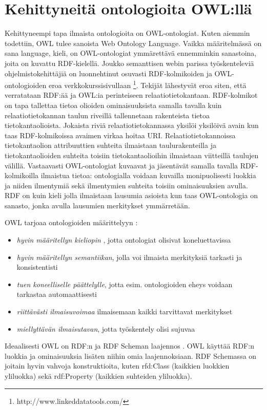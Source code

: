 \documentclass[finnish]{tktltiki2}
\theoremstyle{definition}
\theoremstyle{remark}
\begin{document}
\section{Kehittyneitä ontologioita OWL:llä}

Kehittyneempi tapa ilmaista ontologioita on OWL-ontologiat. Kuten aiemmin todettiin, OWL tulee 
sanoista Web Ontology Language. Vaikka määritelmässä on sana language, kieli, on 
OWL-ontologiat ymmärettävä ennemminkin sanastoina, joita on kuvattu RDF-kielellä.
Joukko semanttisen webin parissa työskenteleviä ohjelmistokehittäjiä on luonnehtinut osuvasti RDF-kolmikoiden ja OWL-ontologioiden eroa verkkokurssisivullaan \footnote{http://www.linkeddatatools.com/}.
Tekijät lähestyvät eroa siten, että verratataan RDF:ää ja OWL:ia perinteiseen relaatiotietokantaan. RDF-kolmikot on tapa tallettaa tietoa olioiden ominaisuuksista samalla tavalla kuin
relaatiotietokannan taulun riveillä tallennetaan rakenteista tietoa tietokantaolioista. Jokaista riviä relaatiotietokannassa
yksilöi yksilöivä avain kun taas RDF-kolmikoissa avaimen virkaa hoitaa URI. Relaatiotietokannoissa tietokantaolion attribuuttien suhteita ilmaistaan taulurakenteilla ja tietokantaolioiden suhteita toisiin tietokantaolioihin ilmaistaan viitteillä taulujen välillä. Vastaavasti OWL-ontologiat kuvaavat ja jäsentävät  samalla tavalla RDF-kolmikoilla ilmaistua tietoa: ontologialla voidaan kuvailla monipuolisesti luokkia ja niiden ilmentymiä sekä ilmentymien suhteita toisiin ominaisuuksien avulla. RDF on kuin kieli jolla ilmaistaan lausumia asioista kun taas OWL-ontologia on sanasto, jonka avulla lausumien merkitykset ymmärretään. 

OWL tarjoaa ontologioiden määrittelyyn \cite{AH09}: 
\begin{itemize}
\item \textit{hyvin määritellyn kieliopin} , jotta ontologiat olisivat koneluettavissa
\item \textit{hyvin määritellyn semantiikan}, jolla voi ilmaista merkityksiä tarkasti ja konsistentisti
\item \textit{tuen koneelliselle päättelylle}, jotta esim.  ontologioiden eheys voidaan tarkastaa automaattisesti
\item \textit{riittävästi ilmaisuvoimaa} ilmaisemaan kaikki tarvittavat merkitykset
\item \textit{miellyttävän ilmaisutavan}, jotta työskentely olisi sujuvaa
\end{itemize}

Ideaalisesti OWL on RDF:n ja RDF Scheman laajennos \cite{AH09}. OWL käyttää
RDF:n luokkia ja ominaisuuksia lisäten niihin omia laajennoksiaan. RDF Schemassa on joitain 
hyvin vahvoja konstruktioita, kuten rfd:Class
(kaikkien luokkien yliluokka) sekä rdf:Property (kaikkien suhteiden yliluokka).
\end{document}
